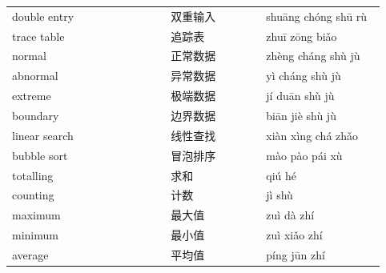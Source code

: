 \documentclass[11pt]{article}
\begin{document}
\begin{longtable}{@{}p{0.40\linewidth}p{0.24\linewidth}p{0.30\linewidth}@{}}
double entry & 双重输入 & shuāng chóng shū rù \\
trace table & 追踪表 & zhuī zōng biǎo \\
normal & 正常数据 & zhèng cháng shù jù \\
abnormal & 异常数据 & yì cháng shù jù \\
extreme & 极端数据 & jí duān shù jù \\
boundary & 边界数据 & biān jiè shù jù \\
linear search & 线性查找 & xiàn xìng chá zhǎo \\
bubble sort & 冒泡排序 & mào pào pái xù \\
totalling & 求和 & qiú hé \\
counting & 计数 & jì shù \\
maximum & 最大值 & zuì dà zhí \\
minimum & 最小值 & zuì xiǎo zhí \\
average & 平均值 & píng jūn zhí \\
\end{longtable}
\end{document}
